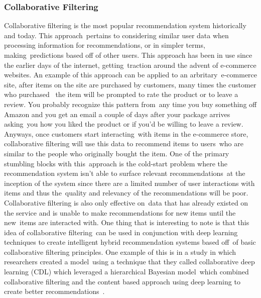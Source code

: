 \documentclass[letterpaper,12pt]{article}
\begin{document}
\subsubsection{Collaborative Filtering}
Collaborative filtering is the most popular recommendation system historically and today. This approach\
pertains to considering similar user data when processing information for recommendations, or in simpler terms, making\
predictions based off of other users. This approach has been in use since the earlier days of the internet, getting\
traction around the advent of e-commerce websites. An example of this approach can be applied to an arbritary\
e-commerce site, after items on the site are purchased by customers, many times the customer who purchased \
the item will be prompted to rate the product or to leave a review. You probably recognize this pattern from\
any time you buy something off Amazon and you get an email a couple of days after your package arrives asking\
you how you liked the product or if you'd be willing to leave a review. Anyways, once customers start interacting\
with items in the e-commerce store, collaborative filtering will use this data to recommend items to users\
who are similar to the people who originally bought the item. One of the primary stumbling blocks with this\
approach is the cold-start problem where the recommendation system isn't able to surface relevant recommendations\
at the inception of the system since there are a limited number of user interactions with items and thus the\
quality and relevancy of the recommendations will be poor. \cite{wang2017dynamic} Collaborative filtering is also only effective on\
data that has already existed on the service and is unable to make recommendations for new items until the new\
items are interacted with. One thing that is interesting to note is that this idea of collaborative filtering\
can be used in conjunction with deep learning techniques to create intelligent hybrid recommendation systems based off\
of basic collaborative filtering principles. One example of this is in a study in which researchers created a model\
using a technique that they called collaborative deep learning (CDL) which leveraged a hierarchical Bayesian model\
which combined collaborative filtering and the content based approach using deep learning to create better recommendations\
. \cite{Wang2015}
\end{document}
